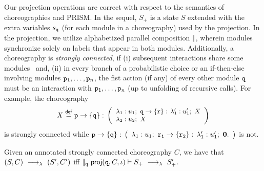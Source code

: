  Our projection operations are correct with
respect to the semantics of choreographies and PRISM. In the sequel,
$S_+$ is a state $S$ extended with the extra variables $s_{\mathtt{q}}$
(for each module in a choreography) used by the projection. In the
projection, we utilize alphabetized parallel composition $|\!|$,
wherein modules synchronize solely on labels that appear in both
modules.
Additionally, a choreography is {\em strongly connected},  
%
if (i) subsequent interactions share some modules~\cite{CHY12} and,
%
(ii) in every branch of a probabilistic choice or an if-then-else
involving modules $\mathtt{p}_1, \ldots, \mathtt{p}_n$, the fist action (if
any) of every other module $\mathtt{q}$ must be an interaction with
$\mathtt{p}_1, \ldots, \mathtt{p}_n$ (up to unfolding of recursive
calls). For example, the choreography
%
\begin{displaymath}\small
  X\stackrel{\mathsf{def}}{=} 
  \interactBase{p}{q}:\,
  \left(
    \begin{array}{l}
      \lambda_1: u_1;\ \interactBase{q}{r}:\, \lambda_1':u_1';\ X    \\
      \lambda_2: u_2;\ X
    \end{array}
  \right)
\end{displaymath}
%
 is strongly connected while 
%
$%
  \interactBase{p}{q}:\,
  \left(
    \begin{array}{l}
      \lambda_1: u_1;\ \interactBase{r_1}{r_2}:\, \lambda_1':u_1';\ \CEnd.
    \end{array}
  \right) $ is not.
%
\begin{theorem}[EPP]\label{thm:epp}
  Given 
  an
  annotated strongly connected choreography $C$, we have that
  $(S,C) \ \longrightarrow_{\lambda}\  (S', C')$ iff
  $|\!|_{\mathtt{q}}\ \mathsf{proj} (\mathtt{q}, C,\iota)\vdash S_{+} \ \longrightarrow_{\lambda}\ 
  S_{+}'$.
\end{theorem}
